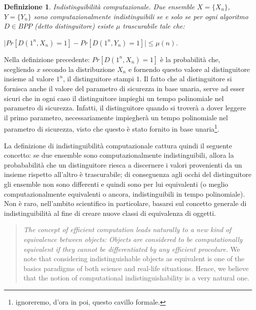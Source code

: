 \documentclass[a4paper,openright,twoside,12pt]{report}
\newtheorem{definizione}{Definizione}[chapter]
\begin{document}
\begin{definizione}{Indistinguibilit\`a computazionale.}
Due ensemble $X=\{X_n\}$, $Y=\{Y_n\}$ sono computazionalmente indistinguibili se e solo se per ogni algoritmo $D \in BPP$ (detto distinguitore) esiste $\mu$ trascurabile tale che:
\begin{center}$\lvert Pr[D(1^n, X_n) = 1] - Pr[D(1^n, Y_n) = 1] \rvert \leq \mu(n)$.\end{center}
\end{definizione}
Nella definizione precedente: $Pr[D(1^n, X_n) = 1]$ \`e la probabilit\`a che, scegliendo $x$ secondo la distribuzione $X_n$ e fornendo questo valore al distinguitore insieme al valore $1^n$, il distinguitore stampi $1$.
Il fatto che al distinguitore si fornisca anche il valore del parametro di sicurezza in base unaria, serve ad esser sicuri che in ogni caso il distinguitore impieghi un tempo polinomiale 
nel parametro di sicurezza.
Infatti, il distinguitore quando si trover\`a a dover leggere il primo parametro, necessariamente impiegher\`a un tempo polinomiale nel parametro di sicurezza, visto che questo \`e stato 
fornito in base unaria\footnote{ignoreremo, d'ora in poi, questo cavillo formale.}.

La definizione di indistinguibilit\`a computazionale cattura quindi il seguente concetto: se due ensemble sono computazionalmente indistinguibili, 
allora la probababilit\`a che un distinguitore riesca a discernere i valori provenienti da un insieme rispetto all'altro \`e trascurabile; di conseguenza agli occhi del distinguitore 
gli ensemble non sono differenti e quindi sono per lui equivalenti (o meglio computazionalmente equivalenti o ancora, indistinguibili in tempo polinomiale). 
Non \`e raro, nell'ambito scientifico in particolare, basarsi sul concetto generale di indistinguibilit\`a al fine di creare nuove classi di equivalenza di oggetti.
\newpage
\begin{quotation}
\emph{The concept of efficient computation leads naturally to a new kind of equivalence between objects: Objects are considered to be computationally equivalent if they cannot be
differentiated by any efficient procedure.} We note that considering indistinguishable objects as equivalent is one of the basics paradigms of both science and real-life situations. Hence,
we believe that the notion of computational indistinguishability is a very natural one.\cite{519078}
\end{quotation}
\end{document}
